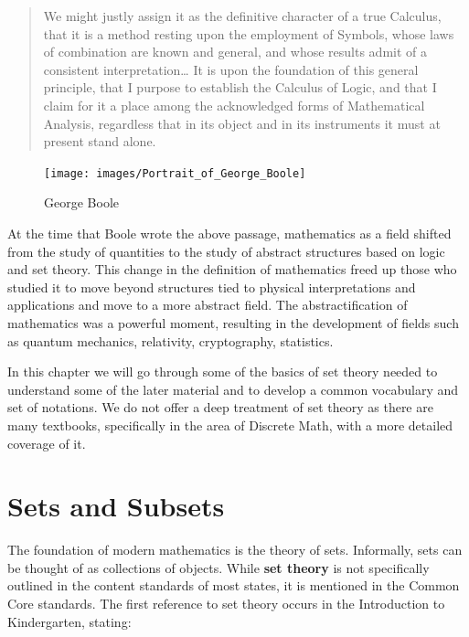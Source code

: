 \documentclass[
]{book}
\let\stdsection\section
\renewcommand\section{\newpage\stdsection}
\theoremstyle{definition}
\theoremstyle{definition}
\theoremstyle{definition}
\theoremstyle{definition}
\theoremstyle{remark}
\begin{document}
\begin{quote}
We might justly assign it as the definitive character of a true Calculus, that it is a method resting upon the employment of Symbols, whose laws of combination are known and general, and whose results admit of a consistent interpretation\ldots{} It is upon the foundation of this general principle, that I purpose to establish the Calculus of Logic, and that I claim for it a place among the acknowledged forms of Mathematical Analysis, regardless that in its object and in its instruments it must at present stand alone.
\end{quote}

\begin{figure}

{\centering \texttt{[image: images/Portrait\_of\_George\_Boole]} 

}

\caption{George Boole}\label{fig:unnamed-chunk-4}
\end{figure}

At the time that Boole wrote the above passage, mathematics as a field shifted from the study of quantities to the study of abstract structures based on logic and set theory. This change in the definition of mathematics freed up those who studied it to move beyond structures tied to physical interpretations and applications and move to a more abstract field. The abstractification of mathematics was a powerful moment, resulting in the development of fields such as quantum mechanics, relativity, cryptography, statistics.

In this chapter we will go through some of the basics of set theory needed to understand some of the later material and to develop a common vocabulary and set of notations. We do not offer a deep treatment of set theory as there are many textbooks, specifically in the area of Discrete Math, with a more detailed coverage of it.

\hypertarget{sets-and-subsets}{%
\section{Sets and Subsets}\label{sets-and-subsets}}

The foundation of modern mathematics is the theory of sets. Informally, sets can be thought of as collections of objects. While \textbf{set theory} is not specifically outlined in the content standards of most states, it is mentioned in the Common Core standards. The first reference to set theory occurs in the Introduction to Kindergarten, stating:
\end{document}
